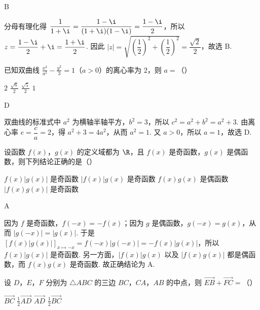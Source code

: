 \begin{answer}
B
\end{answer}

\begin{solution}
分母有理化得 \(\dfrac{1}{1+\i}=\dfrac{1-\i}{(1+\i)(1-\i)}=\dfrac{1-\i}{2}\)，所以 \(z=\dfrac{1-\i}{2}+\i=\dfrac{1+\i}{2}\). 因此 \(|z|=\sqrt{\left(\dfrac{1}{2}\right)^2+\left(\dfrac{1}{2}\right)^2}=\dfrac{\sqrt{2}}{2}\)，故选 B.
\end{solution}

\begin{problem}
已知双曲线 \(\frac{x^2}{a^2} - \frac{y^2}{3} = 1\)（\(a > 0\)）的离心率为 \(2\)，则 \(a =\)（\quad）

\choices
    {\(2\)}
    {\(\frac{\sqrt{6}}{2}\)}
    {\( \frac{\sqrt{5}}{2} \)}
    {\(1\)}
\end{problem}

\begin{answer}
D
\end{answer}

\begin{solution}
双曲线的标准式中 \(a^2\) 为横轴半轴平方，\(b^2=3\)，所以 \(c^2=a^2+b^2=a^2+3\). 由离心率 \(e=\dfrac{c}{a}=2\)，得 \(a^2+3=4a^2\)，从而 \(a^2=1\). 又 \(a>0\)，所以 \(a=1\)，故选 D.
\end{solution}

\begin{problem}
设函数 \( f(x)\)，\(g(x)\) 的定义域都为 \( \R \)，且 \( f(x) \) 是奇函数，\( g(x) \) 是偶函数，则下列结论正确的是（\quad）

\choices
    {\(f(x)|g(x)|\) 是奇函数}
    {\( |f(x)|g(x) \) 是奇函数}
    {\(f(x)g(x)\) 是偶函数}
    {\( |f(x)g(x)| \) 是奇函数}
\end{problem}

\begin{answer}
    A
\end{answer}

\begin{solution}
因为 \(f\) 是奇函数，\(f(-x)=-f(x)\)；因为 \(g\) 是偶函数，\(g(-x)=g(x)\)，从而 \(|g(-x)|=|g(x)|\). 于是 \([f(x)|g(x)|]_{x\mapsto -x}=f(-x)|g(-x)|=-f(x)|g(x)|\)，所以 \(f(x)|g(x)|\) 是奇函数. 另一方面，\(|f(x)|g(x)\) 以及 \(|f(x)g(x)|\) 都是偶函数，而 \(f(x)g(x)\) 是奇函数. 故正确结论为 A.
\end{solution}

\begin{problem}
设 \(D\)，\(E\)，\(F\) 分别为 \(\triangle ABC\) 的三边 \(BC\)，\(CA\)，\(AB\) 的中点，则 \(\overrightarrow{EB} + \overrightarrow{FC} =\)（\quad）

\choices
    {\(\overrightarrow{BC}\)}
    {\(\frac{1}{2}\overrightarrow{AD}\)}
    {\(\overrightarrow{AD}\)}
    {\(\frac{1}{2}\overrightarrow{BC}\)}
\end{problem}

